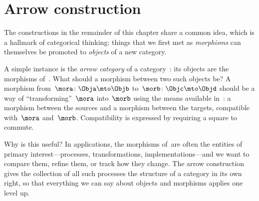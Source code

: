 
\section{Arrow construction}
\label{sec:arrow-construction}


The constructions in the remainder of this chapter share a common idea, which is a hallmark of categorical thinking: things that we first met as \emph{morphisms} can themselves be promoted to \emph{objects} of a new category.

A simple instance is the \emph{arrow category} of a category~\CatC: its objects are the morphisms of~\CatC.
What should a morphism between two such objects be?
A morphism from~$\mora \colon \Obja \mto \Objb$ to~$\morb \colon \Objc \mto \Objd$ should be a way of ``transforming''~$\mora$ into~$\morb$ using the means available in~\CatC: a morphism between the sources and a morphism between the targets, compatible with~$\mora$ and~$\morb$.
Compatibility is expressed by requiring a square to commute.

Why is this useful?
In applications, the morphisms of~\CatC are often the entities of primary interest---processes, transformations, implementations---and we want to compare them, refine them, or track how they change.
The arrow construction gives the collection of all such processes the structure of a category in its own right, so that everything we can say about objects and morphisms applies one level up.

